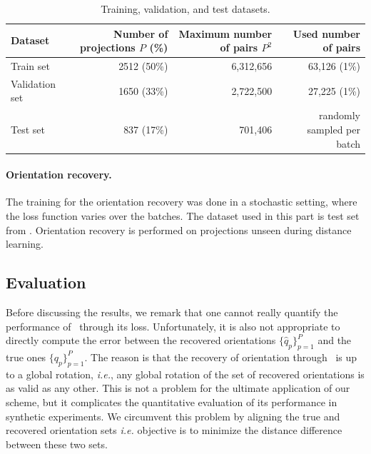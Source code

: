 \begin{table}
    \centering
    \begin{tabular}{lrrr}
        \toprule
        Dataset & Number of projections $P$ (\%) & Maximum number of pairs $P^2$ & Used number of pairs \\
        \midrule
        Train set & 2512 (50\%) & 6,312,656 & 63,126 (1\%) \\
        Validation set & 1650 (33\%) & 2,722,500 & 27,225 (1\%) \\
        Test set & 837 (17\%) & 701,406 & randomly sampled per batch \\
        \bottomrule
    \end{tabular}
    \caption{Training, validation, and test datasets.}\label{tab:dataset}
\end{table}

\paragraph{Orientation recovery.}
The training for the orientation recovery was done in a stochastic setting, where the loss function varies over the batches.
The dataset used in this part is test set from .
Orientation recovery is performed on projections unseen during distance learning.

\subsection{Evaluation}\label{sec:results:evaluation}



Before discussing the results, we remark that one cannot really quantify the performance of~ through its loss.
Unfortunately, it is also not appropriate to directly compute the error between the recovered orientations $\big\{\widehat{q}_p\big\}_{p=1}^P$ and the true ones $\big\{q_p\big\}_{p=1}^P$.
The reason is that the recovery of orientation through~ is up to a global rotation, \textit{i.e.}, any global rotation of the set of recovered orientations is as valid as any other.
This is not a problem for the ultimate application of our scheme, but it complicates the quantitative evaluation of its performance in synthetic experiments.
We circumvent this problem by aligning the true and recovered orientation sets \textit{i.e.} objective is to minimize the distance difference between these two sets.


